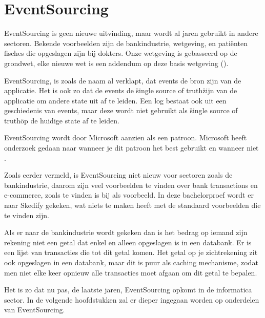 
\chapter{EventSourcing}
\label{ch:eventsourcing}

EventSourcing is geen nieuwe uitvinding, maar wordt al jaren gebruikt in andere sectoren. Bekende voorbeelden zijn de bankindustrie, wetgeving, en patiënten fisches die opgeslagen zijn bij dokters. Onze wetgeving is gebasseerd op de grondwet, elke nieuwe wet is een addendum op deze basis wetgeving (\cite{belgischewetgeving}). 

EventSourcing, is zoals de naam al verklapt, dat events de bron zijn van de applicatie. Het is ook zo dat de events de \"single source of truth\" zijn van de applicatie om andere state uit af te leiden. Een log bestaat ook uit een geschiedenis van events, maar deze wordt niet gebruikt als \"single source of truth\" op de huidige state af te leiden.

EventSourcing wordt door Microsoft aanzien als een patroon. Microsoft heeft onderzoek gedaan naar wanneer je dit patroon het best gebruikt en wanneer niet \autocite{Microsoft2017ES}.

Zoals eerder vermeld, is EventSourcing niet nieuw voor sectoren zoals de bankindustrie, daarom zijn veel voorbeelden te vinden over bank transactions en e-commerce, zoals te vinden is bij \textcite{Microsoft2017ES} als voorbeeld. In deze bachelorproef wordt er naar Skedify gekeken, wat niets te maken heeft met de standaard voorbeelden die te vinden zijn.

Als er naar de bankindustrie wordt gekeken dan is het bedrag op iemand zijn rekening niet een getal dat enkel en alleen opgeslagen is in een databank. Er is een lijst van transacties die tot dit getal komen. Het getal op je zichtrekening zit ook opgeslagen in een  databank, maar dit is puur als caching mechanisme, zodat men niet elke keer opnieuw alle transacties moet afgaan om dit getal te bepalen.

Het is zo dat nu pas, de laatste jaren, EventSourcing opkomt in de informatica sector. In de volgende hoofdstukken zal er dieper ingegaan worden op onderdelen van EventSourcing.